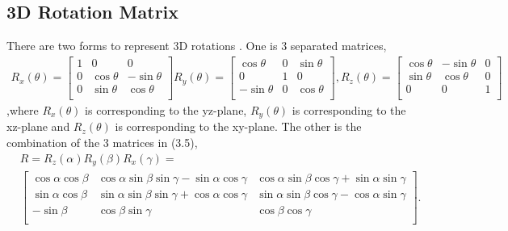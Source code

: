 \subsection{3D Rotation Matrix}
There are two forms to represent 3D rotations \cite{r9}. One is 3 separated matrices,
\begin{equation}
\begin{aligned}
R_{x}(\theta)=\begin{bmatrix}
1&          0&          0\\
0&\cos\theta & -\sin\theta\\
0&\sin\theta & \cos\theta\\
\end{bmatrix}
R_{y}(\theta)=\begin{bmatrix}
  \cos\theta&          0&\sin\theta\\
           0&          1& 0\\
-\sin\theta &          0&\cos\theta\\
\end{bmatrix},
R_{z}(\theta)=\begin{bmatrix}
\cos\theta&-\sin\theta&0\\
\sin\theta& \cos\theta&0\\
         0&          0&1\\
\end{bmatrix}
\end{aligned}
\end{equation}
,where $R_{x}(\theta)$ is corresponding to the yz-plane, $R_{y}(\theta)$ is corresponding to the xz-plane and $R_{z}(\theta)$ is corresponding to the xy-plane. The other is the combination of the 3 matrices in (3.5), 
\begin{equation}
\begin{aligned}
&R=R_{z}(\alpha)R_{y}(\beta)R_{x}(\gamma)=\\
&\begin{bmatrix}
\cos\alpha\cos\beta&\cos\alpha\sin\beta\sin\gamma-\sin\alpha\cos\gamma&\cos\alpha\sin\beta\cos\gamma+\sin\alpha\sin\gamma\\
\sin\alpha\cos\beta&\sin\alpha\sin\beta\sin\gamma+\cos\alpha\cos\gamma&\sin\alpha\sin\beta\cos\gamma-\cos\alpha\sin\gamma\\
         -\sin\beta&                               \cos\beta\sin\gamma&\cos\beta\cos\gamma\\
\end{bmatrix}.
\end{aligned}
\end{equation}
